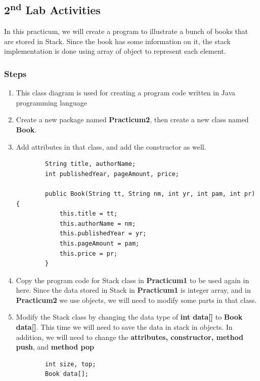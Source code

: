 \documentclass[12pt,titlepage]{article}
\begin{document}
\subsection{2\textsuperscript{nd} Lab Activities}
In this practicum, we will create a program to illustrate a bunch of books that are stored in Stack. Since the book has some information on it, the stack implementation is done using array of object to represent each element.

\subsubsection{Steps}
\begin{enumerate}
    \item This class diagram is used for creating a program code written in Java programming language
    \mbox{}\\
    \item Create a new package named \textbf{Practicum2}, then create a new class named \textbf{Book}.
    \item Add attributes in that class, and add the constructor as well.
    \begin{verbatim}
        String title, authorName;
        int publishedYear, pageAmount, price;

        public Book(String tt, String nm, int yr, int pam, int pr) {
            this.title = tt;
            this.authorName = nm;
            this.publishedYear = yr;
            this.pageAmount = pam;
            this.price = pr;
        }
    \end{verbatim}
    \item Copy the program code for Stack class in \textbf{Practicum1} to be used again in here. Since the data stored in Stack in \textbf{Practicum1} is integer array, and in \textbf{Practicum2} we use objects, we will need to modify some parts in that class.
    \item Modify the Stack class by changing the data type of \textbf{int data[]} to \textbf{Book data[]}. This time we will need to save the data in stack in objects. In addition, we will need to change the \textbf{attributes, constructor, method push}, and \textbf{method pop}
    \begin{verbatim}
        int size, top;
        Book data[];


\end{verbatim}
\end{enumerate}
\end{document}
